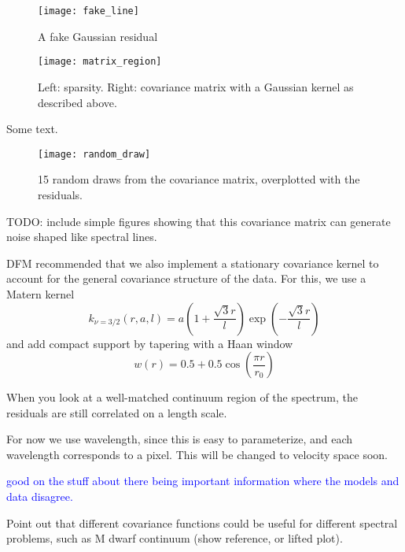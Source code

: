 \documentclass[preprint]{aastex} %
\newcommand{\hcom}[1]{ \textcolor{Blue}{#1}}
\begin{document}
\begin{figure}[!htb]
\begin{center}
\texttt{[image: fake\_line]}
\caption{A fake Gaussian residual}
\label{fig:fake_line}
\end{center}
\end{figure}

\begin{figure}[!htb]
\begin{center}
\texttt{[image: matrix\_region]}
\caption{Left: sparsity. Right: covariance matrix with a Gaussian kernel as described above.}
\label{fig:matrix_region}
\end{center}
\end{figure}

Some text.

\begin{figure}[!htb]
\begin{center}
\texttt{[image: random\_draw]}
\caption{15 random draws from the covariance matrix, overplotted with the residuals.}
\label{fig:random_draw}
\end{center}
\end{figure}

TODO: include simple figures showing that this covariance matrix can generate noise shaped like spectral lines. 

DFM recommended that we also implement a stationary covariance kernel to account for the general covariance structure of the data. For this, we use a Matern kernel \begin{equation}
  k_{\nu = 3/2}(r, a, l) = a \left(1 + \frac{\sqrt{3} r}{l} \right ) \exp \left (- \frac{\sqrt{3} r}{l} \right ) 
\end{equation}
and add compact support by tapering with a Haan window
\begin{equation}
  w(r) = 0.5 + 0.5 \cos \left( \frac{\pi r}{r_0} \right)
\end{equation}

When you look at a well-matched continuum region of the spectrum, the residuals are still correlated on a length scale.

For now we use wavelength, since this is easy to parameterize, and each wavelength corresponds to a pixel. This will be changed to velocity space soon.

\hcom{good on the stuff about there being important information where the models and data disagree.}

Point out that different covariance functions could be useful for different spectral problems, such as M dwarf continuum (show reference, or lifted plot).
\end{document}
